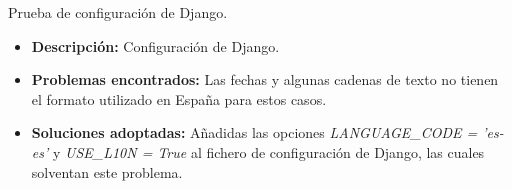 \item Prueba de configuración de Django.
  \begin{itemize}
    \item \textbf{Descripción:} Configuración de Django.
    \item \textbf{Problemas encontrados:} Las fechas y algunas cadenas de texto
    no tienen el formato utilizado en España para estos casos.
    \item \textbf{Soluciones adoptadas:} Añadidas las opciones
    \textit{LANGUAGE\_CODE = 'es-es'} y \textit{USE\_L10N = True} al fichero de
    configuración de Django, las cuales solventan este problema.
  \end{itemize}
